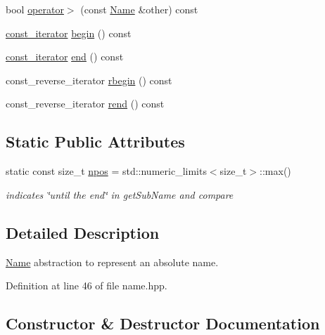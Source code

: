 \begin{DoxyCompactItemize}
\item 
bool \hyperlink{classndn_1_1Name_aa7ebfb8450f1696f50b6e442250fbeaf}{operator$>$} (const \hyperlink{classndn_1_1Name}{Name} \&other) const
\item 
\hyperlink{classndn_1_1name_1_1Component}{const\+\_\+iterator} \hyperlink{classndn_1_1Name_afdfceefe3e0bb4af0c3c171b01407a2d}{begin} () const
\item 
\hyperlink{classndn_1_1name_1_1Component}{const\+\_\+iterator} \hyperlink{classndn_1_1Name_aa27048ff1455eddcda4462049118a27b}{end} () const
\item 
const\+\_\+reverse\+\_\+iterator \hyperlink{classndn_1_1Name_a49c9eeda44e37b312d21d0d2944e58c3}{rbegin} () const
\item 
const\+\_\+reverse\+\_\+iterator \hyperlink{classndn_1_1Name_a904eb5b3dc7a55fe3648496c79c0a587}{rend} () const
\end{DoxyCompactItemize}
\subsection*{Static Public Attributes}
\begin{DoxyCompactItemize}
\item 
static const size\+\_\+t \hyperlink{classndn_1_1Name_aa53d45ef5e55ed9224b75b4fc99dd692}{npos} = std\+::numeric\+\_\+limits$<$size\+\_\+t$>$\+::max()\hypertarget{classndn_1_1Name_aa53d45ef5e55ed9224b75b4fc99dd692}{}\label{classndn_1_1Name_aa53d45ef5e55ed9224b75b4fc99dd692}

\begin{DoxyCompactList}\small\item\em indicates \char`\"{}until the end\char`\"{} in get\+Sub\+Name and compare \end{DoxyCompactList}\end{DoxyCompactItemize}


\subsection{Detailed Description}
\hyperlink{classndn_1_1Name}{Name} abstraction to represent an absolute name. 

Definition at line 46 of file name.\+hpp.



\subsection{Constructor \& Destructor Documentation}
